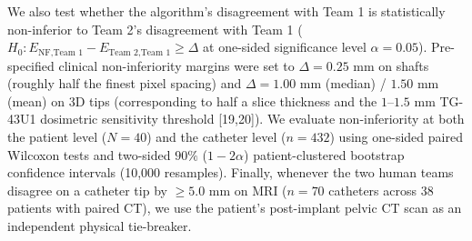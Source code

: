 \documentclass[
  11pt,
]{article}
\begin{document}
We also test whether the algorithm's disagreement with Team 1 is
statistically non-inferior to Team 2's disagreement with Team 1
(\(H_0: E_{\text{NF},\text{Team 1}} - E_{\text{Team 2},\text{Team 1}} \ge \Delta\)
at one-sided significance level \(\alpha = 0.05\)). Pre-specified
clinical non-inferiority margins were set to \(\Delta = 0.25\text{ mm}\)
on shafts (roughly half the finest pixel spacing) and
\(\Delta = 1.00\text{ mm}\) (median) / \(1.50\text{ mm}\) (mean) on 3D
tips (corresponding to half a slice thickness and the
\(1\text{--}1.5\text{ mm}\) TG-43U1 dosimetric sensitivity threshold
{[}19,20{]}). We evaluate non-inferiority at both the patient level
(\(N = 40\)) and the catheter level (\(n = 432\)) using one-sided paired
Wilcoxon tests and two-sided \(90\%\) (\(1 - 2\alpha\))
patient-clustered bootstrap confidence intervals (10,000 resamples).
Finally, whenever the two human teams disagree on a catheter tip by
\(\ge 5.0\text{ mm}\) on MRI (\(n = 70\) catheters across 38 patients
with paired CT), we use the patient's post-implant pelvic CT scan as an
independent physical tie-breaker.
\end{document}
